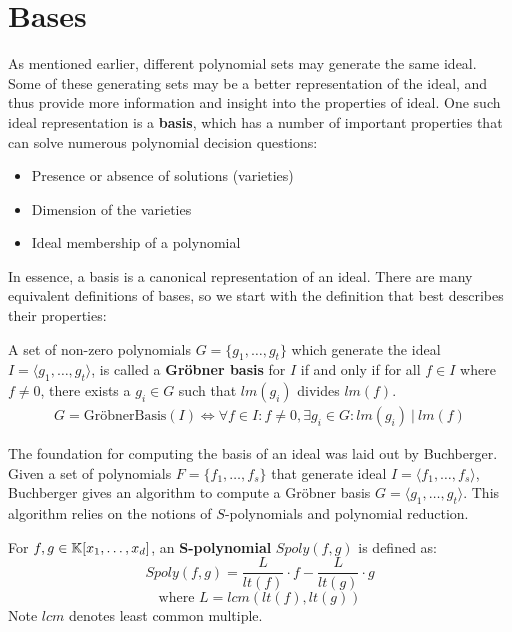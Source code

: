 \section{\Grobner Bases}

As mentioned earlier, different polynomial sets may generate the same 
ideal. Some of these generating sets may be a better representation of 
the ideal, and thus provide more information and insight into the properties 
of ideal. One such ideal representation is a {\bf \Grobner basis}, which has
a number of important properties that can solve numerous polynomial 
decision questions:

\begin{itemize}
\item Presence or absence of solutions (varieties)
\item Dimension of the varieties
\item Ideal membership of a polynomial
\end{itemize} 

In essence, a \Grobner basis is a canonical representation of an ideal.
There are many equivalent definitions of \Grobner bases, so we start with 
the definition that best describes their properties:

\begin{Definition}
A set of non-zero polynomials $G=\{g_1,\dots,g_t\}$ which generate the 
ideal $I=\langle g_1,\dots,g_t\rangle$, is called a 
{\bf Gr\"obner basis} for $I$ if and only if 
for all $f \in I$ where $f \neq 0$, there exists a $g_i \in G$ such that $lm(g_i)$ divides $lm(f)$.
\begin{eqnarray}
G = \text{Gr\"obner{Basis}} (I) \iff 
\forall f \in I: f \neq 0, \exists g_i \in G: lm(g_i)\ |\ lm(f)
        \label{eqn:groebnermin}
    \end{eqnarray}
    
\end{Definition}

The foundation for computing the \Grobner basis of an ideal was laid out 
by Buchberger\cite{buchberger_thesis}.
Given a set of polynomials $F=\{f_{1},\dots,f_{s}\}$ that generate ideal $I=
\langle f_{1},\dots,f_{s} \rangle$, 
Buchberger gives an algorithm to compute a Gr\"obner basis $G=\langle g_{1},
\dots,g_{t}\rangle$. This algorithm relies on the notions of $S$-polynomials 
and polynomial reduction.

\begin{Definition}
For $f, g \in {\mathbb{K}}[x_1,\dots,x_d]$, an {\bf S-polynomial} $Spoly(f,g)$ is 
defined as:
\begin{equation}
    Spoly(f,g)=\frac{L}{lt(f)}\cdot f - \frac{L}{lt(g)}\cdot g
    \label{eqn:spoly}
\end{equation}
\begin{equation}
\text{where }L = lcm\left(lt(f), lt(g)\right) \nonumber
\end{equation}
Note $lcm$ denotes least common multiple.
\end{Definition}


